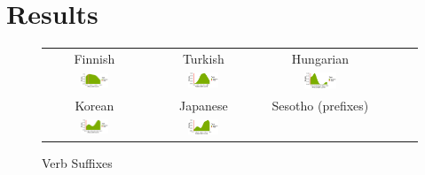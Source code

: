 \documentclass[11pt,letterpaper]{article}
\begin{document}

\section{Results}




\begin{figure}
    \centering
    \begin{tabular}{cccccc}
    Finnish & Turkish & Hungarian \\
        \includegraphics[width=0.3\textwidth]{figures/finnish_verbs/suffixes-byMorphemes-auc-hist-heldout-Coarse-FineSurprisal-optimized.pdf}
        &
    \includegraphics[width=0.3\textwidth]{figures/turkish_verbs/suffixes-byMorphemes-auc-hist-heldout-Coarse-FineSurprisal-optimized.pdf}
    &
    \includegraphics[width=0.3\textwidth]{figures/hungarian_verbs/suffixes-byMorphemes-auc-hist-heldout-Coarse-FineSurprisal-optimized.pdf}
    \\
    Korean & Japanese & Sesotho (prefixes) \\
    \includegraphics[width=0.3\textwidth]{figures/korean/suffixes-byMorphemes-auc-hist-heldout-Coarse-FineSurprisal-optimized.pdf}
    &
        \includegraphics[width=0.3\textwidth]{figures/japanese/suffixes-byMorphemes-auc-hist-heldout-Coarse-FineSurprisal-optimized.pdf}
    \end{tabular}
    \caption{Verb Suffixes}
    \label{fig:my-label}
\end{figure}
\end{document}
